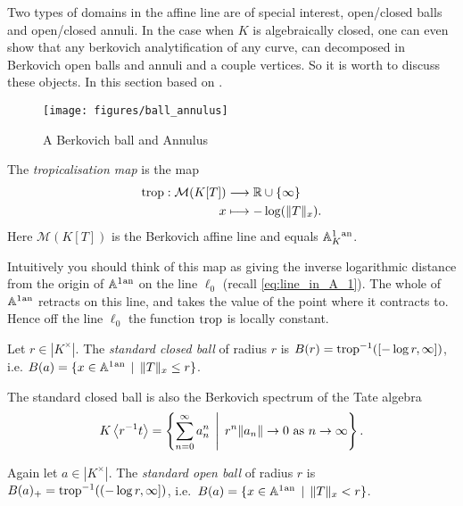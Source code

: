 Two types of domains in the affine line are of special interest, open/closed balls and open/closed annuli. 
In the case when $K$ is algebraically closed, one can even show that any berkovich analytification of any curve, can decomposed in Berkovich open balls and annuli and a couple vertices. 
So it is worth to discuss these objects. 
In this section based on \cite[sec.\ 2]{bakerStructureNonarchimedeanAnalytic2013}.
\begin{figure}[h]
	\centering
	\texttt{[image: figures/ball\_annulus]}
	\caption{A Berkovich ball and Annulus}
	\label{fig:ball_annulus}
\end{figure}
\begin{definition}
	The \emph{tropicalisation map} is the map 
	\begin{align*}
		\operatorname{trop} :  \mathcal{M} (K[T]) &\longrightarrow \mathbb{R} \cup \{\infty\}  \\
		x &\longmapsto -\log( \|T\|_x)
	.\end{align*}
	Here $\mathcal{M} (K[T])$ is the Berkovich affine line and equals $\mathbb{A}^{1}_K{}^{\text{an}}$. 
\end{definition}
Intuitively you should think of this map as giving the inverse logarithmic distance from the origin of $\mathbb{A}^{1}{}^{\text{an}}$ on the line $\ell_0$ (recall \cref{eq:line_in_A_1}).  
The whole of $\mathbb{A}^{1}{}^{\text{an}} $ retracts on this line, and takes the value of the point where it contracts to. Hence off the line $\ell_0$ the function $\operatorname{trop}$ is locally constant. 



\begin{definition}
	Let $r \in |K^{\times }|$. The \emph{standard closed ball} of radius $r$ is $B(r) = \operatorname{trop}^{-1}([-\log r, \infty])$, i.e. $B(a) = \{x \in \aff^{1}\an \st \|T\|_x \le r\} $. 
\end{definition}
The standard closed ball is also the Berkovich spectrum of the Tate algebra \[
K\left<r^{-1}t \right> = \left\{\sum_{n = 0}^{\infty} a_n ^{n} \st r ^{n} \|a_n\| \to 0 \text{ as } n \to \infty \right\} 
.\] 
\begin{definition}
	Again let $a \in |K^{\times }|$. 
	The \emph{standard open ball} of radius $r$ is $B(a)_+ = \operatorname{trop}^{-1}((-\log r, \infty])$, i.e.\ $B(a) = \{x \in \aff^{1}\an \st \|T\|_x <  r\} $.
\end{definition}

